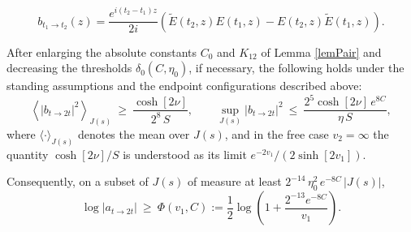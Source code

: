 \documentclass[10pt,a4paper]{amsart}
\def\d{\delta}
\def\ti{\tilde}
\def\to{\rightarrow}
\begin{document}
\begin{equation}
b_{t_1 \to t_2}(z)=\frac {e^{i(t_2-t_1)z}}{2i}\left( \ti E(t_2,z)E(t_1,z)-E(t_2,z)\ti E(t_1,z)\right) .
\label{fin11}\end{equation}

\begin{lemma}\label{lemSweep}
After enlarging the absolute constants $C_0$ and $K_{12}$ of Lemma \ref{lemPair} and decreasing the thresholds $\d_0(C,\eta_0)$, if necessary, the following holds under the standing assumptions and the endpoint configurations described above:
\begin{equation}
\left\langle |b_{t\to2t}|^2\right\rangle_{J(s)}\ \geq\ \frac{\cosh[2\nu]}{2^8\,S},
\qquad
\sup_{J(s)}|b_{t\to2t}|^2\ \leq\ \frac{2^5\cosh[2\nu]\,e^{8C}}{\eta\,S},
\label{eqSweepMoments}
\end{equation}
where $\langle\cdot\rangle_{J(s)}$ denotes the mean over $J(s)$, and in the free case $v_2=\infty$ the quantity $\cosh[2\nu]/S$ is understood as its limit $e^{-2v_1}/(2\sinh[2v_1])$.

Consequently, on a subset of $J(s)$ of measure at least $2^{-14}\,\eta_0^2\,e^{-8C}\,|J(s)|$,
\begin{equation}
\log|a_{t\to2t}|\ \geq\ \Phi(v_1,C):=\frac12\log\left(1+\frac{2^{-13}e^{-8C}}{v_1}\right).
\label{eqSweepLevel}
\end{equation}
\end{lemma}
\end{document}
